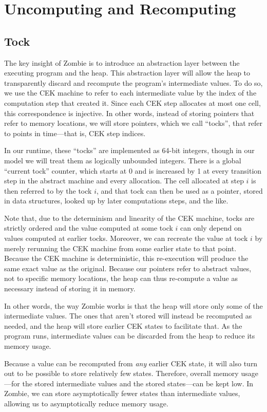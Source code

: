 \section{Uncomputing and Recomputing}
\subsection{Tock}
The key insight of Zombie is to introduce an abstraction layer between the executing program and the heap. This abstraction layer will allow the heap to transparently discard and recompute the program's intermediate values. To do so, we use the CEK machine to refer to each intermediate value by the index of the computation step that created it. Since each CEK step allocates at most one cell, this correspondence is injective. In other words, instead of storing pointers that refer to memory locations, we will store pointers, which we call ``tocks'', that refer to points in time---that is, CEK step indices.

In our runtime, these ``tocks'' are implemented as 64-bit integers, though in our model we will treat them as logically unbounded integers. There is a global ``current tock'' counter, which starts at 0 and is increased by 1 at every transition step in the abstract machine and every allocation. The cell allocated at step $i$ is then referred to by the tock $i$, and that tock can then be used as a pointer, stored in data structures, looked up by later computations steps, and the like.

Note that, due to the determinism and linearity of the CEK machine, tocks are strictly ordered and the value computed at some tock $i$ can only depend on values computed at earlier tocks. Moreover, we can recreate the value at tock $i$ by merely rerunning the CEK machine from some earlier state to that point. Because the CEK machine is deterministic, this re-execution will produce the same exact value as the original. Because our pointers refer to abstract values, not to specific memory locations, the heap can thus re-compute a value as necessary instead of storing it in memory.

In other words, the way Zombie works is that the heap will store only some of the intermediate values. The ones that aren't stored will instead be recomputed as needed, and the heap will store earlier CEK states to facilitate that. As the program runs, intermediate values can be discarded from the heap to reduce its memory usage.

Because a value can be recomputed from \emph{any} earlier CEK state, it will also turn out to be possible to store relatively few states. Therefore, overall memory usage---for the stored intermediate values and the stored states---can be kept low. In Zombie, we can store asymptotically fewer states than intermediate values, allowing us to asymptotically reduce memory usage.


